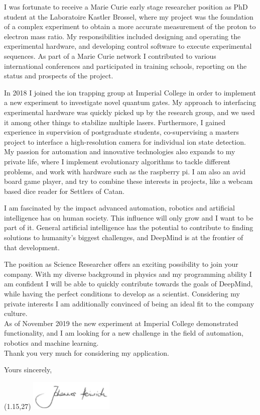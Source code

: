 \documentclass[10pt, a4paper]{class_cover_letter}
\begin{document}
I was fortunate to receive a Marie Curie early stage researcher position as PhD student at the Laboratoire Kastler Brossel, where my project was the foundation of a complex experiment to obtain a more accurate measurement of the proton to electron mass ratio. My responsibilities included designing and operating the experimental hardware, and developing control software to execute experimental sequences. As part of a Marie Curie network I contributed to various international conferences and participated in training schools, reporting on the status and prospects of the project.

In 2018 I joined the ion trapping group at Imperial College in order to implement a new experiment to investigate novel quantum gates. My approach to interfacing experimental hardware was quickly picked up by the research group, and we used it among other things to stabilize multiple lasers. Furthermore, I gained experience in supervision of postgraduate students, co-supervising a masters project to interface a high-resolution camera for individual ion state detection.\\

My passion for automation and innovative technologies also expands to my private life, where I implement evolutionary algorithms to tackle different problems, and work with hardware such as the raspberry pi. I am also an avid board game player, and try to combine these interests in projects, like a webcam based dice reader for Settlers of Catan. 

I am fascinated by the impact advanced automation, robotics and artificial intelligence has on human society. This influence will only grow and I want to be part of it. General artificial intelligence has the potential to contribute to finding solutions to humanity's biggest challenges, and DeepMind is at the frontier of that development.

The position as Science Researcher offers an exciting possibility to join your company. With my diverse background in physics and my programming ability I am confident I will be able to quickly contribute towards the goals of DeepMind, while having the perfect conditions to develop as a scientist. Considering my private interests I am additionally convinced of being an ideal fit to the company culture.\\

As of November 2019 the new experiment at Imperial College demonstrated functionality, and I am looking for a new challenge in the field of automation, robotics and machine learning.\\

Thank you very much for considering my application.

\vspace{0.7cm}
Yours sincerely,

\begin{textblock}{10}(1.15,27)
\includegraphics[width=4cm]{unterschrift.png}
\end{textblock}
\end{document}
